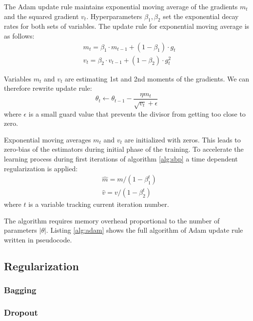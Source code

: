 The Adam update rule maintains exponential moving average of the gradients $m_t$ and the squared gradient $v_t$.
Hyperparameters $\beta_1, \beta_2$ set the exponential decay rates for both sets of variables.
The update rule for exponential moving average is as follows:
\begin{equation*}
  \begin{aligned}
    & m_t = \beta_1 \cdot m_{t-1} + (1-\beta_1) \cdot g_t \\
    & v_t = \beta_2 \cdot v_{t-1} + (1-\beta_2) \cdot g_t^2
  \end{aligned}
\end{equation*}

Variables $m_t$ and $v_t$ are estimating 1st and 2nd moments of the gradients.
We can therefore rewrite update rule:
\begin{equation}
  \theta_t \gets \theta_{t-1} - \frac{\eta m_t}{\sqrt{v_t} + \epsilon}
\end{equation}
where $\epsilon$ is a small guard value that prevents the divisor from getting too close to zero.

Exponential moving averages $m_t$ and $v_t$ are initialized with zeros.
This leads to zero-bias of the estimators during initial phase of the training.
To accelerate the learning process during first iterations of algorithm \ref{alg:sbp} a time dependent regularization is applied:
\begin{equation*}
  \begin{aligned}
    & \hat{m} = m / (1-\beta_1^t) \\
    & \hat{v} = v/(1-\beta_2^t)
  \end{aligned}
\end{equation*}
where $t$ is a variable tracking current iteration number.

The algorithm requires memory overhead proportional to the number of parameters $|\theta|$. Listing \ref{alg:adam} shows the full algorithm of Adam update rule written in pseudocode.



\subsection{Regularization}

\subsubsection{Bagging}
\subsubsection{Dropout}

